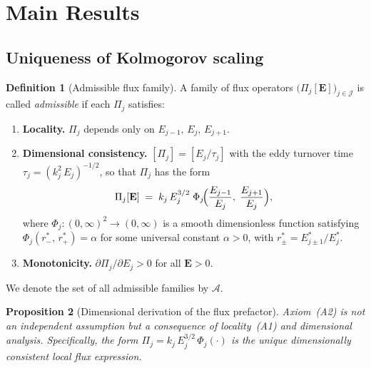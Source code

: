 \documentclass[12pt,a4paper]{article}
\theoremstyle{definition}
\newtheorem{definition}{Definition}[section]
\theoremstyle{plain}
\newtheorem{proposition}[definition]{Proposition}
\theoremstyle{remark}
\begin{document}
\section{Main Results}\label{sec:results}

\subsection{Uniqueness of Kolmogorov scaling}

\begin{definition}[Admissible flux family]\label{def:admissible}
A family of flux operators $\bigl(\Pi_j[\mathbf{E}]\bigr)_{j \in
\mathcal{J}}$ is called \emph{admissible} if each $\Pi_j$ satisfies:
\begin{enumerate}
  \item[\textup{(A1)}] \textbf{Locality.}\;
    $\Pi_j$ depends only on $E_{j-1},\, E_j,\, E_{j+1}$.
  \item[\textup{(A2)}] \textbf{Dimensional consistency.}\;
    $[\Pi_j] = [E_j / \tau_j]$ with the eddy turnover time
    $\tau_j = (k_j^2\,E_j)^{-1/2}$, so that $\Pi_j$ has the form
    \begin{equation}\label{eq:closure_general}
      \Pi_j[\mathbf{E}]
      \;=\;
      k_j\,E_j^{3/2}\;\Phi_j\!\Bigl(
        \frac{E_{j-1}}{E_j},\;
        \frac{E_{j+1}}{E_j}
      \Bigr),
    \end{equation}
    where $\Phi_j : (0,\infty)^2 \to (0,\infty)$ is a smooth
    dimensionless function satisfying $\Phi_j(r^*_{-},\, r^*_{+}) = \alpha$
    for some universal constant $\alpha > 0$, with
    $r^*_{\pm} = E_{j \pm 1}^* / E_j^*$.
  \item[\textup{(A3)}] \textbf{Monotonicity.}\;
    $\partial \Pi_j / \partial E_j > 0$ for all $\mathbf{E} > 0$.
\end{enumerate}
We denote the set of all admissible families by $\mathscr{A}$.
\end{definition}

\begin{proposition}[Dimensional derivation of the flux prefactor]\label{prop:A2-derived}
Axiom~\textup{(A2)} is not an independent assumption but a consequence of locality~\textup{(A1)} and dimensional analysis. Specifically, the form $\Pi_j = k_j\,E_j^{3/2}\,\Phi_j(\cdot)$ is the \emph{unique} dimensionally consistent local flux expression.
\end{proposition}
\end{document}
